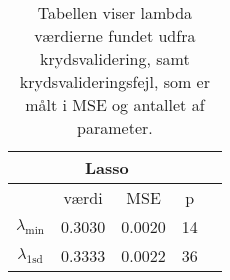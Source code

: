 \begin{table}
\center
\begin{tabular}{ccccc}
\toprule
 \multicolumn{4}{c}{Lasso} \\ \midrule
 & værdi & MSE & p \\
 $\lambda_{\min}$ & 0.3030 & 0.0020 & 14   \\ 
 $\lambda_{1 \text{sd}}$ & 0.3333 & 0.0022 & 36  \\ \bottomrule
 \end{tabular}
\caption{Tabellen viser lambda værdierne fundet udfra krydsvalidering, samt krydsvalideringsfejl, som er målt i MSE og antallet af parameter.} \label{tab:lars_tab}
\end{table}
